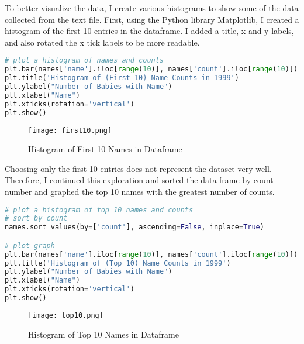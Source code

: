 \documentclass[journal]{IEEEtran}
\begin{document}
To better visualize the data, I create various histograms to show some of the data collected from the text file. First, using the Python library Matplotlib, I created a histogram of the first 10 entries in the dataframe. I added a title, x and y labels, and also rotated the x tick labels to be more readable. 
\begin{lstlisting}[language=Python, caption={Creating and Styling Histogram}]
# plot a histogram of names and counts 
plt.bar(names['name'].iloc[range(10)], names['count'].iloc[range(10)])
plt.title('Histogram of (First 10) Name Counts in 1999')
plt.ylabel("Number of Babies with Name")
plt.xlabel("Name")
plt.xticks(rotation='vertical')
plt.show()
\end{lstlisting}
\begin{figure}[h!]
\texttt{[image: first10.png]}
\centering
\caption{Histogram of First 10 Names in Dataframe}
\end{figure}

Choosing only the first 10 entries does not represent the dataset very well. Therefore, I continued this exploration and sorted the data frame by count number and graphed the top 10 names with the greatest number of counts. 
\begin{lstlisting}[language=Python, caption={Sorting Data and Creating Histogram}]
# plot a histogram of top 10 names and counts 
# sort by count
names.sort_values(by=['count'], ascending=False, inplace=True)

# plot graph
plt.bar(names['name'].iloc[range(10)], names['count'].iloc[range(10)])
plt.title('Histogram of (Top 10) Name Counts in 1999')
plt.ylabel("Number of Babies with Name")
plt.xlabel("Name")
plt.xticks(rotation='vertical')
plt.show()
\end{lstlisting}
\begin{figure}[h!]
\texttt{[image: top10.png]}
\centering
\caption{Histogram of Top 10 Names in Dataframe}
\end{figure}
\end{document}
